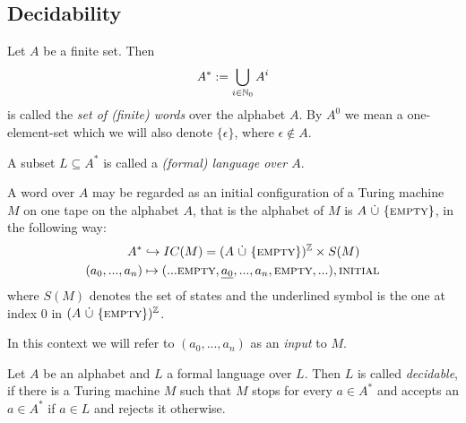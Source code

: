 \subsection{Decidability}

\begin{Definition}
	Let $A$ be a finite set. Then
	\begin{align*}
		A^* := \bigcup_{i \in \mathbb{N}_0} A^i
	\end{align*}
	is called the \emph{set of (finite) words} over the alphabet $A$.
	By $A^0$ we mean a one-element-set which we will also denote $\{\epsilon\}$, where $\epsilon \notin A$.

	A subset $L \subseteq A^*$ is called a \emph{(formal) language over $A$}.
\end{Definition}

A word over $A$ may be regarded as an initial configuration of a Turing machine $M$ on one tape on the alphabet $A$, that is the alphabet of $M$ is $A~\dot\cup~\{\text{\scshape{empty}}\}$, in the following way:
\begin{align*}
	A^* &\hookrightarrow IC(M) = (A~\dot\cup~\{\text{\scshape{empty}}\})^{\mathbb{Z}} \times S(M) \\
	(a_0, ... , a_n) &\mapsto (...\text{\scshape{empty}},\underline{a_0},...,a_n,\text{\scshape{empty}},...) , \text{\scshape{initial}} 
\end{align*}
where $S(M)$ denotes the set of states and the underlined symbol is the one at index $0$ in $(A~\dot\cup~\{\text{\scshape{empty}}\})^{\mathbb{Z}}$.

In this context we will refer to $(a_0,...,a_n)$ as an \emph{input} to $M$.

\begin{Definition}
	\label{halting_problem:decidability:definition_decidable}
	Let $A$ be an alphabet and $L$ a formal language over $L$. Then $L$ is called \emph{decidable}, if there is a Turing machine $M$ such that $M$ stops for every $a \in A^*$ and accepts an $a \in A^*$ if $a \in L$ and rejects it otherwise.
\end{Definition}

